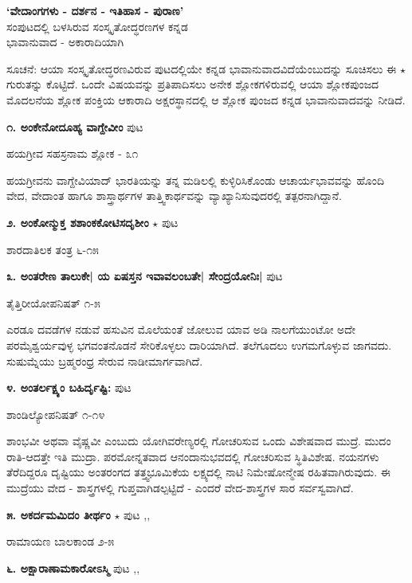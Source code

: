 \begin{center}
\medskip
\noindent\textbf{\large `ವೇದಾಂಗಗಳು - ದರ್ಶನ - ಇತಿಹಾಸ - ಪುರಾಣ'}\\
\large{ಸಂಪುಟದಲ್ಲಿ ಬಳಸಿರುವ ಸಂಸ್ಕೃತೋದ್ಧರಣಗಳ ಕನ್ನಡ}\\
\large{ಭಾವಾನುವಾದ - ಅಕಾರಾದಿಯಾಗಿ}
\end{center}

ಸೂಚನೆ: ಆಯಾ ಸಂಸ್ಕೃತೋದ್ಧರಣವಿರುವ ಪುಟದಲ್ಲಿಯೇ ಕನ್ನಡ ಭಾವಾನುವಾದವಿದೆಯೆಂಬುದನ್ನು ಸೂಚಿಸಲು ಈ  $\star$ ಗುರುತನ್ನು ಕೊಟ್ಟಿದೆ. ಒಂದೇ ವಿಷಯವನ್ನು ಪ್ರತಿಪಾದಿಸಲು ಅನೇಕ ಶ್ಲೋಕಗಳಿರುವಲ್ಲಿ ಆಯಾ ಶ್ಲೋಕಪುಂಜದ ಮೊದಲನೆಯ ಶ್ಲೋಕ ಪಂಕ್ತಿಯ ಆಕಾರಾದಿ ಅಕ್ಷರಸ್ಥಾನದಲ್ಲಿ ಆ ಶ್ಲೋಕ ಪುಂಜದ ಕನ್ನಡ ಭಾವಾನುವಾದವನ್ನು ನೀಡಿದೆ.

\medskip
\medskip
\noindent\textbf{೧. ಅಂಕೇನೋದೂಹ್ಯ ವಾಗ್ದೇವೀಂ} \hfill ಪುಟ \pageref{32}

\hfill ಹಯಗ್ರೀವ ಸಹಸ್ರನಾಮ ಶ್ಲೋಕ - ೩೧

ಹಯಗ್ರೀವನು ವಾಗ್ದೇವಿಯಾದ್ ಭಾರತಿಯನ್ನು ತನ್ನ ಮಡಿಲಲ್ಲಿ ಕುಳ್ಳಿರಿಸಿಕೊಂಡು ಆಚಾರ್ಯಭಾವವನ್ನು ಹೊಂದಿ ವೇದ, ವೇದಾಂತ ಹಾಗೂ ಶಾಸ್ತ್ರಾರ್ಥಗಳ ತಾತ್ತ್ವಿಕಾರ್ಥವನ್ನು ವ್ಯಾಖ್ಯಾನಿಸುವುದರಲ್ಲಿ ತತ್ಪರನಾಗಿದ್ದಾನೆ.

\medskip
\noindent\textbf{೨. ಅಂಕೋನ್ಮುಕ್ತ ಶಶಾಂಕಕೋಟಿಸದೃಶೀಂ} $\star$ \hfill ಪುಟ \pageref{31}

\hfill ಶಾರದಾತಿಲಕ ತಂತ್ರ ೬-೧೫

\medskip
\noindent\textbf{೩. ಅಂತರೇಣ ತಾಲುಕೇ| ಯ ಏಷಸ್ತನ ಇವಾವಲಂಬತೇ| ಸೇಂದ್ರಯೋನಿಃ|} \hfill ಪುಟ \pageref{26}

\hfill ತೈತ್ತಿರೀಯೋಪನಿಷತ್ ೧-೫

ಎರಡೂ ದವಡೆಗಳ ನಡುವೆ ಹಸುವಿನ ಮೊಲೆಯಂತೆ ಜೋಲುವ ಯಾವ ಅಡಿ ನಾಲಗೆಯುಂಟೋ ಅದೇ ಪರಮೈಶ್ವರ್ಯವುಳ್ಳ ಭಗವಂತನೊಡನೆ ಸೇರಿಕೊಳ್ಳಲು ದಾರಿಯಾಗಿದೆ. ತಲೆಗೂದಲು ಉಗಮಗೊಳ್ಳುವ ಜಾಗವದು. ಸುಷುಮ್ನೆಯು ಬ್ರಹ್ಮರಂಧ್ರ ಸೇರುವ ನಾಡೀಮಾರ್ಗವಾಗಿದೆ.

\medskip
\noindent\textbf{೪. ಅಂತರ್ಲಕ್ಷ್ಯಂ ಬಹಿರ್ದೃಷ್ಟಿ:} \hfill ಪುಟ \pageref{244}

\hfill ಶಾಂಡಿಲ್ಯೋಪನಿಷತ್ ೧-೧೪

ಶಾಂಭವೀ ಅಥವಾ ವೈಷ್ಣವೀ ಎಂಬುದು ಯೋಗಿವರೇಣ್ಯರಲ್ಲಿ ಗೋಚರಿಸುವ ಒಂದು ವಿಶೇಷವಾದ ಮುದ್ರೆ. ಮುದಂ ರಾತಿ-ಆದತ್ತೇ ಇತಿ ಮುದ್ರಾ. ಪರಮೋನ್ನತವಾದ ಆನಂದಾನುಭವದಲ್ಲಿ ಗೋಚರಿಸುವ ಸ್ಥಿತಿವಿಶೇಷ. ನಯನಗಳು ತೆರೆದಿದ್ದರೂ ದೃಷ್ಟಿಯು ಅಂತರಂಗದ ತತ್ತ್ವಭೂಮಿಕೆಯ ಲಕ್ಷ್ಯದಲ್ಲಿ ನಾಟಿ ನಿಮೇಷೋನ್ಮೇಷ ರಹಿತವಾಗಿರುವುದು. ಈ ಮುದ್ರೆಯು ವೇದ - ಶಾಸ್ತ್ರಗಳಲ್ಲಿ ಗುಪ್ತವಾಗಿಡಲ್ಪಟ್ಟಿದೆ - ಎಂದರೆ ವೇದ-ಶಾಸ್ತ್ರಗಳ ಸಾರ ಸರ್ವಸ್ವವಾಗಿದೆ.

\medskip
\noindent\textbf{೫. ಅಕರ್ದಮಮಿದಂ ತೀರ್ಥಂ } $\star$ \hfill ಪುಟ \pageref{156},\pageref{164},\pageref{175}

\hfill ರಾಮಾಯಣ ಬಾಲಕಾಂಡ ೨-೫

\medskip
\noindent\textbf{೬. ಅಕ್ಷಾರಾಣಾಮಕಾರೋಽಸ್ಮಿ } \hfill ಪುಟ \pageref{93},\pageref{95},\pageref{97}

